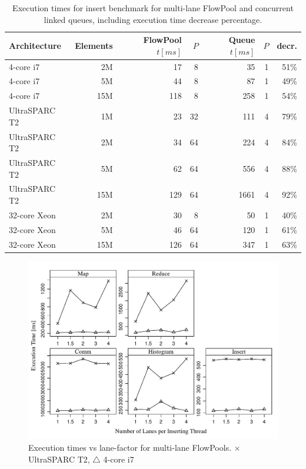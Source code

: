 \documentclass[runningheads,a4paper]{llncs}
\begin{document}

\begin{table}[t]
\centering
\begin{tabular}{l@{\qquad}r@{\quad}r@{\quad}r@{\quad}r@{\quad}r@{\qquad}r}
  Architecture & Elements & FlowPool $t [ms]$ & $P$ & Queue $t [ms]$ & $P$ & decr.\\
\hline
    4-core i7 &  2M &  17 &  8 &   35 & 1 & 51\%\\
    4-core i7 &  5M &  44 &  8 &   87 & 1 & 49\%\\
    4-core i7 & 15M & 118 &  8 &  258 & 1 & 54\%\\
\hline
UltraSPARC T2 &  1M &  23 & 32 &  111 & 4 & 79\%\\
UltraSPARC T2 &  2M &  34 & 64 &  224 & 4 & 84\%\\
UltraSPARC T2 &  5M &  62 & 64 &  556 & 4 & 88\%\\
UltraSPARC T2 & 15M & 129 & 64 & 1661 & 4 & 92\%\\
\hline
 32-core Xeon &  2M &  30 &  8 &   50 & 1 & 40\%\\
 32-core Xeon &  5M &  46 & 64 &  120 & 1 & 61\%\\
 32-core Xeon & 15M & 126 & 64 &  347 & 1 & 63\%\\
\end{tabular}

\caption{Execution times for insert benchmark for multi-lane FlowPool
  and concurrent linked queues, including execution time decrease
  percentage.} \label{tbl:execution-times}
\end{table}

\begin{figure}[ht!]
\includegraphics[width=\textwidth]{../../benchmarks/graphs/lanef-scaling}
\caption{Execution times vs lane-factor for multi-lane
  FlowPools. $\times$ UltraSPARC T2, $\triangle$ 4-core i7}
\label{fig:eval-lane-factor}
\end{figure}
\end{document}
